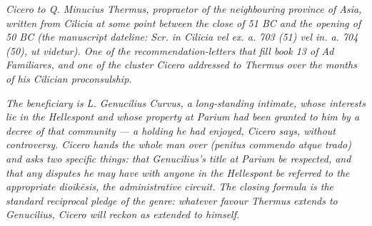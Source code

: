 
\textit{Cicero to Q. Minucius Thermus, propraetor of the neighbouring
province of Asia, written from Cilicia at some point between the close
of 51 BC and the opening of 50 BC (the manuscript dateline:
\textit{Scr. in Cilicia vel ex. a. 703 (51) vel in. a. 704 (50), ut
videtur}). One of the recommendation-letters that fill book 13 of
\textit{Ad Familiares}, and one of the cluster Cicero addressed to
Thermus over the months of his Cilician proconsulship.}

\textit{The beneficiary is L. Genucilius Curvus, a long-standing
intimate, whose interests lie in the Hellespont and whose property at
Parium had been granted to him by a decree of that community --- a
holding he had enjoyed, Cicero says, without controversy. Cicero hands
the whole man over (\textit{penitus commendo atque trado}) and asks
two specific things: that Genucilius's title at Parium be respected,
and that any disputes he may have with anyone in the Hellespont be
referred to the appropriate \textit{dioikēsis}, the administrative
circuit. The closing formula is the standard reciprocal pledge of the
genre: whatever favour Thermus extends to Genucilius, Cicero will
reckon as extended to himself.}

